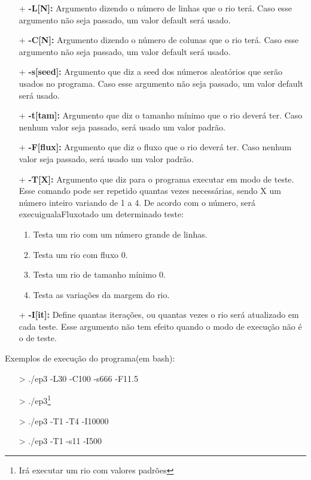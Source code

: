 \documentclass[11pt]{article}
\begin{document}
\begin{itemize}

\item[+] \textbf{-L[{\color{red}N}]:} Argumento dizendo o número de linhas que o rio terá. Caso esse argumento não seja passado, um valor default será usado.

\item[+] \textbf{-C[{\color{red}N}]:} Argumento dizendo o número de colunas que o rio terá. Caso esse argumento não seja passado, um valor default será usado.

\item[+] \textbf{-s[{\color{red}seed}]:} Argumento que diz a seed dos números aleatórios que serão usados no programa. Caso esse argumento não seja passado, um valor default será usado.

\item[+] \textbf{-t[{\color{red}tam}]:} Argumento que diz o tamanho mínimo que o rio deverá ter. Caso nenhum valor seja passado, será usado um valor padrão.

\item[+] \textbf{-F[{\color{red}flux}]:} Argumento que diz o fluxo que o rio deverá ter. Caso nenhum valor seja passado, será usado um valor padrão.

\item[+] \textbf{-T[{\color{red}X}]:} Argumento que diz para o programa executar em modo de teste. Esse comando pode ser repetido quantas vezes necessárias, sendo X um número inteiro variando de 1 a 4. De acordo com o número, será execuigualaFluxotado um determinado teste:
	\begin{enumerate}
		\item Testa um rio com um número grande de linhas.
		\item Testa um rio com fluxo 0.
		\item Testa um rio de tamanho mínimo 0.
		\item Testa as variações da margem do rio.		
	
	\end{enumerate}
	
\item[+] \textbf{-I[{\color{red}it}]:} Define quantas iterações, ou quantas vezes o rio será atualizado em cada teste. Esse argumento não tem efeito quando o modo de execução não é o de teste.

\end{itemize}

Exemplos de execução do programa(em bash):
\begin{itemize}
	\item[>] ./ep3 -L30 -C100 -s666 -F11.5
	\item[>] ./ep3\footnote{Irá executar um rio com valores padrões}
	\item[>] ./ep3 -T1 -T4 -I10000
	\item[>] ./ep3 -T1 -s11 -I500



\end{itemize}
\end{document}
